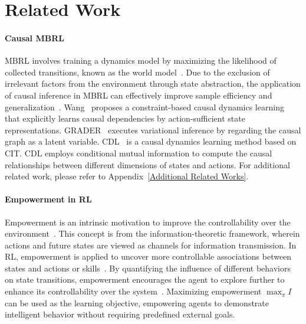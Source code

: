 \section{Related Work}
\paragraph{Causal MBRL}
MBRL involves training a dynamics model by maximizing the likelihood of collected transitions, known as the world model~\citep{moerland2023model,janner2019trust,nguyen2021temporal,zhao2021consciousness}.
Due to the exclusion of irrelevant factors from the environment through state abstraction, the application of causal inference in MBRL can effectively improve sample efficiency and generalization~\citep{ke2021systematic,mutti2023provably,hwang2023quantized}. 
Wang~\citep{wang2021task} proposes a constraint-based causal dynamics learning that explicitly learns causal dependencies by action-sufficient state representations. 
GRADER~\citep{ding2022generalizing} executes variational inference by regarding the causal graph as a latent variable. CDL~\citep{wang2022causal} is a causal dynamics learning method based on CIT. CDL employs conditional mutual information to compute the causal relationships between different dimensions of states and actions. For additional related work, please refer to Appendix~\ref{Additional Related Works}.
\vspace{-3mm}
\paragraph{Empowerment in RL} 
Empowerment is an intrinsic motivation to improve the controllability over the environment~\citep{klyubin2005empowerment,salge2014empowerment}. This concept is from the information-theoretic framework, wherein actions and future states are viewed as channels for information transmission. In RL, empowerment is applied to uncover more controllable associations between states and actions or skills~\citep{mohamed2015variational,bharadhwaj2022information,choi2021variational, eysenbach2018diversity}. By quantifying the influence of different behaviors on state transitions, empowerment encourages the agent to explore further to enhance its controllability over the system~\citep{leibfried2019unified,seitzer2021causal}. Maximizing empowerment $\max_{\pi} I$ can be used as the learning objective, empowering agents to demonstrate intelligent behavior without requiring predefined external goals. 
\vspace{-3mm}
